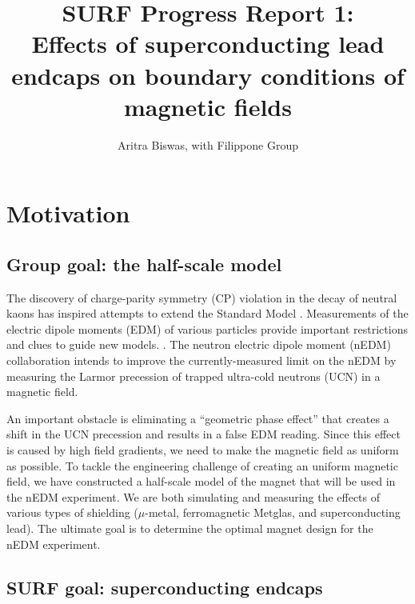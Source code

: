 \documentclass[twocolumn,aps,prb,citeautoscript]{revtex4-1}
\begin{document}
\title{SURF Progress Report 1:\\
Effects of superconducting lead endcaps on boundary conditions of
magnetic fields}
\author{Aritra Biswas, with Filippone Group}



\maketitle

\section{Motivation}

\subsection{Group goal: the half-scale model}

The discovery of charge-parity symmetry (CP) violation 
in the decay of neutral kaons has inspired attempts to extend the
Standard Model \cite{cpv}. Measurements of the electric
dipole moments (EDM) of various particles provide important restrictions
and clues to guide new models. \cite{ill}.
The neutron electric dipole moment (nEDM) collaboration intends to
improve \cite{krl} the currently-measured limit \cite{ill}
on the nEDM by measuring the Larmor precession of trapped
ultra-cold neutrons (UCN) in a magnetic field.

An important obstacle is eliminating a ``geometric phase effect''
that creates a shift in the UCN precession and results in
a false EDM reading. Since this effect is caused by high field gradients,
we need to make the magnetic field as uniform as possible.
To 
tackle the engineering challenge of creating an uniform magnetic field,
we have constructed a half-scale model of the magnet that will be
used in the nEDM experiment. We are both simulating and measuring
the effects of various types of shielding ($\mu$-metal,
ferromagnetic Metglas, and superconducting lead). The ultimate goal is to
determine the optimal magnet design for the nEDM experiment.

\subsection{SURF goal: superconducting endcaps}
\end{document}
